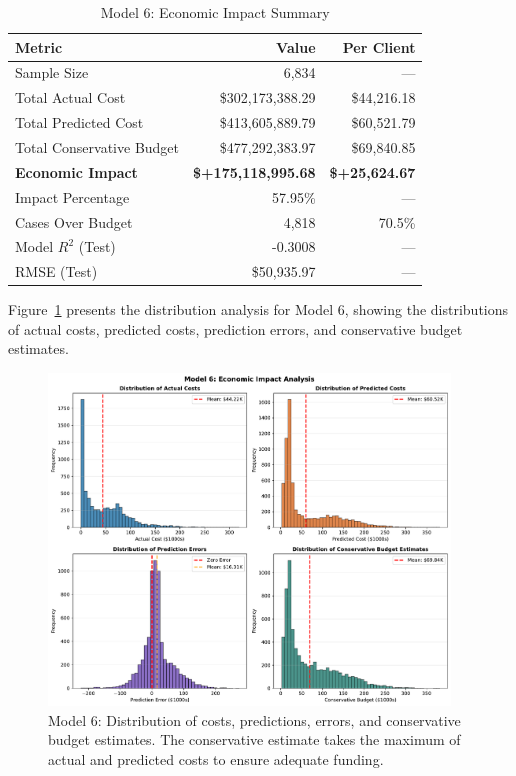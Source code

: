 \begin{table}[htbp]
\centering
\small
\caption{Model 6: Economic Impact Summary}
\label{tab:model6_impact_summary}
\begin{tabular}{lrr}
\toprule
\textbf{Metric} & \textbf{Value} & \textbf{Per Client} \\
\midrule
Sample Size & 6,834 & --- \\
\midrule
Total Actual Cost & \$302,173,388.29 & \$44,216.18 \\
Total Predicted Cost & \$413,605,889.79 & \$60,521.79 \\
Total Conservative Budget & \$477,292,383.97 & \$69,840.85 \\
\midrule
\textbf{Economic Impact} & \textbf{\$+175,118,995.68} & \textbf{\$+25,624.67} \\
Impact Percentage & 57.95\% & --- \\
\midrule
Cases Over Budget & 4,818 & 70.5\% \\
\midrule
Model $R^2$ (Test) & -0.3008 & --- \\
RMSE (Test) & \$50,935.97 & --- \\
\bottomrule
\end{tabular}
\end{table}

Figure~\ref{fig:model6_impact_histograms} presents the distribution analysis for Model 6, showing the distributions of actual costs, predicted costs, prediction errors, and conservative budget estimates.

\begin{figure}[htbp]
\centering
\includegraphics[width=0.95\textwidth]{figures/model_6_Impact_Histograms.pdf}
\caption{Model 6: Distribution of costs, predictions, errors, and conservative budget estimates. The conservative estimate takes the maximum of actual and predicted costs to ensure adequate funding.}
\label{fig:model6_impact_histograms}
\end{figure}

